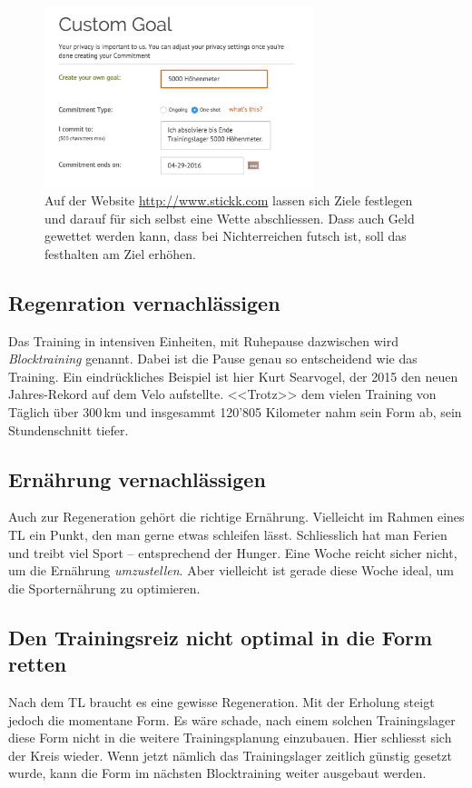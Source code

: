 \documentclass[a4paper,DIV13,BCOR0cm,draft=TRUE]{scrartcl}
\begin{document}
\begin{figure}[htb]
  \centering
  \includegraphics[width=0.7\textwidth]{figs/stickkcom.jpg}

  \caption{Auf der Website \protect\url{http://www.stickk.com} lassen sich Ziele festlegen und darauf für sich selbst eine Wette abschliessen.
    Dass auch Geld gewettet werden kann, dass bei Nichterreichen futsch ist, soll das festhalten am Ziel erhöhen.}
  \label{fig:stickkcom}
\end{figure}




\subsection{Regenration vernachlässigen}

Das Training in intensiven Einheiten, mit Ruhepause dazwischen wird \emph{Blocktraining} genannt.
Dabei ist die Pause genau so entscheidend wie das Training.
Ein eindrückliches Beispiel ist hier Kurt Searvogel, der 2015 den neuen Jahres-Rekord auf dem Velo aufstellte.
<<Trotz>> dem vielen Training von Täglich über 300\,km und insgesammt 120'805 Kilometer nahm sein Form ab,
sein Stundenschnitt tiefer.

\subsection{Ernährung vernachlässigen}

Auch zur Regeneration gehört die richtige Ernährung.
Vielleicht im Rahmen eines TL ein Punkt, den man gerne etwas schleifen lässt.
Schliesslich hat man Ferien und treibt viel Sport -- entsprechend der Hunger.
Eine Woche reicht sicher nicht, um die Ernährung \emph{umzustellen}.
Aber vielleicht ist gerade diese Woche ideal, um die Sporternährung zu optimieren.

\subsection{Den Trainingsreiz nicht optimal in die Form retten}

Nach dem TL braucht es eine gewisse Regeneration. Mit der Erholung steigt jedoch die momentane Form.
Es wäre schade, nach einem solchen Trainingslager diese Form nicht in die weitere Trainingsplanung einzubauen.
Hier schliesst sich der Kreis wieder. Wenn jetzt nämlich das Trainingslager zeitlich günstig gesetzt wurde,
kann die Form im nächsten Blocktraining weiter ausgebaut werden.




\end{document}
